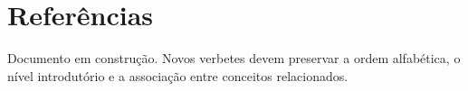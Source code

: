 \documentclass[11pt,a4paper,twoside,openany]{book}
\begin{document}
\backmatter
\chapter*{Referências}

\nocite{*}
\printbibliography[heading=none]

%
%
%

\vfill
\begin{center}
\sffamily\small Documento em construção. Novos verbetes devem preservar a ordem alfabética, o nível introdutório e a associação entre conceitos relacionados.
\end{center}
\end{document}
